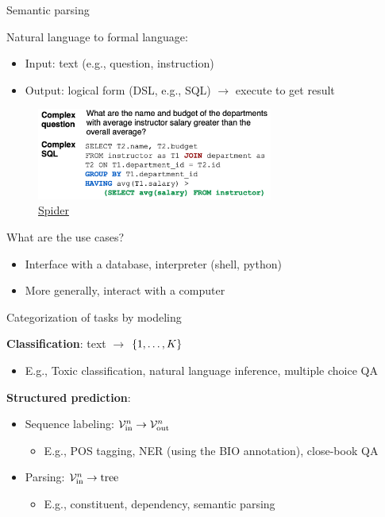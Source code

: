 \documentclass[usenames,dvipsnames,notes,11pt,aspectratio=169,hyperref={colorlinks=true, linkcolor=blue}]{beamer}
\begin{document}
\begin{frame}
    {Semantic parsing}

    Natural language to formal language:\\
    \begin{itemize}
        \item Input: text (e.g., question, instruction)
        \item Output: logical form (DSL, e.g., SQL) $\longrightarrow$ execute to get result
    \end{itemize}

    \begin{figure}
        \includegraphics[height=3cm]{figures/text2sql}
        \caption{\href{https://arxiv.org/pdf/1809.08887.pdf}{Spider}}
    \end{figure}

    What are the use cases?\\\pause
    \begin{itemize}
        \item Interface with a database, interpreter (shell, python)
        \item More generally, interact with a computer
    \end{itemize}
\end{frame}

\begin{frame}
    {Categorization of tasks by modeling}

    \textbf{Classification}: text $\rightarrow$ $\left\{ 1,\ldots,K \right\}$\\
    \begin{itemize}
        \item E.g., Toxic classification, natural language inference, multiple choice QA
    \end{itemize}

    \textbf{Structured prediction}: \\
    \begin{itemize}
        \item Sequence labeling: $\mathcal{V}_{\text{in}}^n \rightarrow \mathcal{V}_{\text{out}}^n$
            \begin{itemize}
                \item E.g., POS tagging, NER (using the BIO annotation), close-book QA 
            \end{itemize}
        \item Parsing: $\mathcal{V}_{\text{in}}^n \rightarrow \text{tree}$
                \begin{itemize}
                    \item E.g., constituent, dependency, semantic parsing 
                \end{itemize}
    \end{itemize}
\end{frame}
\end{document}

